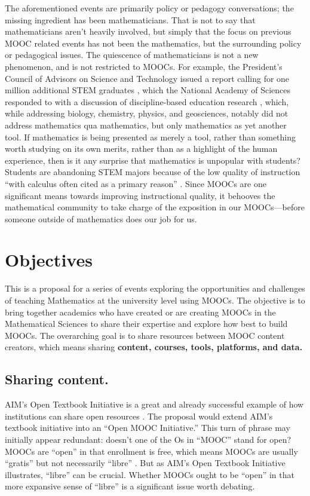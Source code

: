 \documentclass[12pt]{amsart}
\begin{document}
The aforementioned events are primarily policy or pedagogy
conversations; the missing ingredient has been mathematicians.  That
is not to say that mathematicians aren't heavily involved, but simply
that the focus on previous MOOC related events has not been the
mathematics, but the surrounding policy or pedagogical issues.  The
quiescence of mathematicians is not a new phenomenon, and is not
restricted to MOOCs.  For example, the President's Council of Advisors
on Science and Technology issued a report calling for one million
additional STEM graduates \cite{engage-to-excel}, which the National
Academy of Sciences responded to with a discussion of discipline-based
education research \cite{dber-report}, which, while addressing
biology, chemistry, physics, and geosciences, notably did not address
mathematics qua mathematics, but only mathematics as yet another tool.
If mathematics is being presented as merely a tool, rather than
something worth studying on its own merits, rather than as a highlight
of the human experience, then is it any surprise that mathematics is
unpopular with students?  Students are abandoning STEM majors because
of the low quality of instruction ``with calculus often cited as a
primary reason'' \parencite{calculus-programs}.  Since MOOCs are one
significant means towards improving instructional quality, it behooves
the mathematical community to take charge of the exposition in our
MOOCs---before someone outside of mathematics does our job for us.

\section{Objectives}

This is a proposal for a series of events exploring the opportunities
and challenges of teaching Mathematics at the university level using
MOOCs. The objective is to bring together academics who have created
or are creating MOOCs in the Mathematical Sciences to share their
expertise and explore how best to build MOOCs.  The overarching goal
is to share resources between MOOC content creators, which means
sharing \textbf{content, courses, tools, platforms, and data.}

\subsection{Sharing content.}  AIM's Open Textbook Initiative is a
great and already successful example of how institutions can share
open resources \cite{aim-notices}.  The proposal would extend AIM's
textbook initiative into an ``Open MOOC Initiative.''  This turn of
phrase may initially appear redundant: doesn't one of the Os in
``MOOC'' stand for open?  MOOCs are ``open'' in that enrollment is
free, which means MOOCs are usually ``gratis'' but not necessarily
``libre'' \cite{suber2008gratis}.  But as AIM's Open Textbook
Initiative illustrates, ``libre'' can be crucial.  Whether MOOCs ought
to be ``open'' in that more expansive sense of ``libre'' is a
significant issue worth debating.
\end{document}
